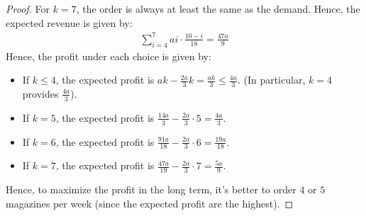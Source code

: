 \documentclass{article}
\begin{document}
\begin{proof}
    For $k=7$, the order is always at least the same as the demand. Hence, the expected revenue is given by:
    \begin{align}
        \sum_{i=4}^{7}ai \cdot \frac{10-i}{18}=\frac{47a}{9}
    \end{align}
    Hence, the profit under each choice is given by:
    \begin{itemize}
        \item If $k\leq 4$, the expected profit is $ak-\frac{2a}{3}k = \frac{ak}{3}\leq \frac{4a}{3}$. (In particular, $k=4$ provides $\frac{4a}{3}$).
        \item If $k=5$, the expected profit is $\frac{14a}{3}-\frac{2a}{3}\cdot 5 = \frac{4a}{3}$.
        \item If $k=6$, the expected profit is $\frac{91a}{18}-\frac{2a}{3}\cdot 6=\frac{19a}{18}$.
        \item If $k=7$, the expected profit is $\frac{47a}{19}-\frac{2a}{3}\cdot 7=\frac{5a}{9}$.
    \end{itemize}
    Hence, to maximize the profit in the long term, it's better to order $4$ or $5$ magazines per week (since the expected profit are the highest).
\end{proof}

\newpage
\end{document}
